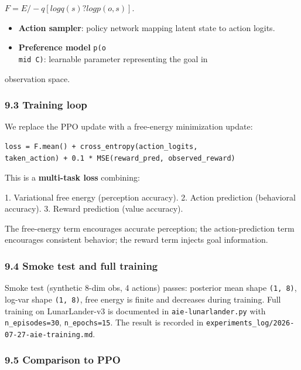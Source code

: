 \documentclass[11pt]{article}
\begin{document}
  $F = E/-q[log q(s) ?log p(o, s)]$.
\begin{itemize}
  \item \textbf{Action sampler}: policy network mapping latent state to action logits.
  \item \textbf{Preference model} \texttt{p(o\\mid C)}: learnable parameter representing the goal in
\end{itemize}

  observation space.

\subsubsection{9.3 Training loop}

We replace the PPO update with a free-energy minimization update:

\begin{verbatim}
loss = F.mean() + cross_entropy(action_logits,
taken_action) + 0.1 * MSE(reward_pred, observed_reward)
\end{verbatim}

This is a \textbf{multi-task loss} combining:

1. Variational free energy (perception accuracy).
2. Action prediction (behavioral accuracy).
3. Reward prediction (value accuracy).

The free-energy term encourages accurate perception; the action-prediction term
encourages consistent behavior; the reward term injects goal information.

\subsubsection{9.4 Smoke test and full training}

\begin{sloppypar}
Smoke test (synthetic 8-dim obs, 4 actions) passes: posterior mean shape
\texttt{(1, 8)}, log-var shape \texttt{(1, 8)}, free energy is finite and decreases during
training. Full training on LunarLander-v3 is documented in
\texttt{aie-lunarlander.py} with \texttt{n\_episodes=30}, \texttt{n\_epochs=15}. The result is recorded
in \texttt{experiments\_log/2026-07-27-aie-training.md}.
\end{sloppypar}

\subsubsection{9.5 Comparison to PPO}
\end{document}
